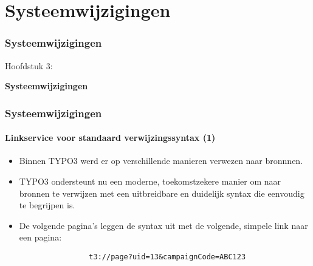%

\section{Systeemwijzigingen}
\begin{frame}[fragile]
	\frametitle{Systeemwijzigingen}

	\begin{center}\huge{Hoofdstuk 3:}\end{center}
	\begin{center}\huge{\color{typo3darkgrey}\textbf{Systeemwijzigingen}}\end{center}

\end{frame}

\begin{frame}[fragile]
	\frametitle{Systeemwijzigingen}
	\framesubtitle{Linkservice voor standaard verwijzingssyntax (1)}

	\begin{itemize}

		\item Binnen TYPO3 werd er op verschillende manieren verwezen naar bronnnen.

		\item TYPO3 ondersteunt nu een moderne, toekomstzekere manier om naar bronnen te verwijzen met een uitbreidbare en
			duidelijk syntax die eenvoudig te begrijpen is.

		\item De volgende pagina's leggen de syntax uit met de volgende, simpele link naar een pagina:

			\begin{lstlisting}
				t3://page?uid=13&campaignCode=ABC123
			\end{lstlisting}

	\end{itemize}

\end{frame}

